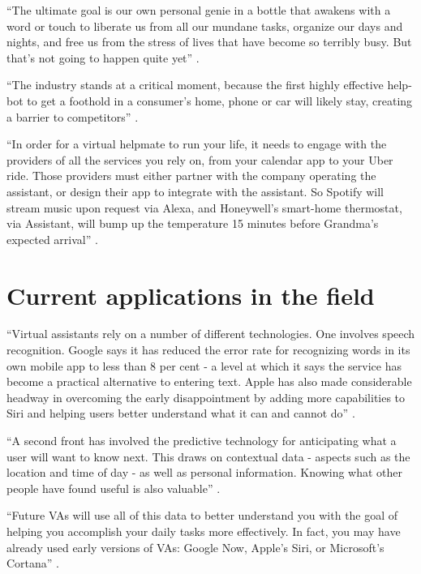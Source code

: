 ``The ultimate goal is our own personal genie in a bottle that awakens with a word or touch to liberate us from all our mundane tasks, organize our days and nights, and free us from the stress of lives that have become so terribly busy. But that’s not going to happen quite yet'' \cite{Baron2017assistants}.

``The industry stands at a critical moment, because the first highly effective help-bot to get a foothold in a consumer’s home, phone or car will likely stay, creating a barrier to competitors'' \cite{Baron2017assistants}.

``In order for a virtual helpmate to run your life, it needs to engage with the providers of all the services you rely on, from your calendar app to your Uber ride. Those providers must either partner with the company operating the assistant, or design their app to integrate with the assistant. So Spotify will stream music upon request via Alexa, and Honeywell's smart-home thermostat, via Assistant, will bump up the temperature 15 minutes before Grandma’s expected arrival'' \cite{Baron2017assistants}.

\section{Current applications in the field}

``Virtual assistants rely on a number of different technologies. One involves speech recognition. Google says it has reduced the error rate for recognizing words in its own mobile app to less than 8 per cent - a level at which it says the service has become a practical alternative to entering text. Apple has also made considerable headway in overcoming the early disappointment by adding more capabilities to Siri and helping users better understand what it can and cannot do'' \cite{Waters2015life}. 

``A second front has involved the predictive technology for anticipating what a user will want to know next. This draws on contextual data - aspects such as the location and time of day - as well as personal information. Knowing what other people have found useful is also valuable'' \cite{Waters2015life}.

``Future VAs will use all of this data to better understand you with the goal of helping you accomplish your daily tasks more effectively. In fact, you may have already used early versions of VAs: Google Now, Apple's Siri, or Microsoft's Cortana'' \cite{Tal2015internet}.

